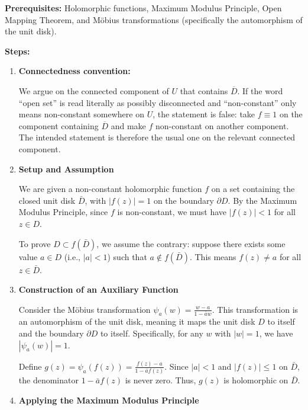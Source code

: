 \begin{solution}
\textbf{Prerequisites:} 
Holomorphic functions, Maximum Modulus Principle, Open Mapping Theorem, and Möbius transformations (specifically the automorphism of the unit disk).

\par\vspace{\baselineskip}
\textbf{Steps:}

\begin{enumerate}
    \item \textbf{Connectedness convention:}

    We argue on the connected component of $U$ that contains $\overline D$.  If the word ``open set'' is read literally as possibly disconnected and ``non-constant'' only means non-constant somewhere on $U$, the statement is false: take $f\equiv 1$ on the component containing $\overline D$ and make $f$ non-constant on another component.  The intended statement is therefore the usual one on the relevant connected component.

    \item \textbf{Setup and Assumption}

    We are given a non-constant holomorphic function $f$ on a set containing the closed unit disk $\bar{D}$, with $|f(z)| = 1$ on the boundary $\partial D$. By the Maximum Modulus Principle, since $f$ is non-constant, we must have $|f(z)| < 1$ for all $z \in D$.

    To prove $D \subset f(\bar{D})$, we assume the contrary: suppose there exists some value $a \in D$ (i.e., $|a| < 1$) such that $a \notin f(\bar{D})$. This means $f(z) \neq a$ for all $z \in \bar{D}$.

    \item \textbf{Construction of an Auxiliary Function}

    Consider the Möbius transformation $\psi_a(w) = \frac{w - a}{1 - \bar{a}w}$. This transformation is an automorphism of the unit disk, meaning it maps the unit disk $D$ to itself and the boundary $\partial D$ to itself. Specifically, for any $w$ with $|w|=1$, we have $|\psi_a(w)| = 1$.

    Define $g(z) = \psi_a(f(z)) = \frac{f(z) - a}{1 - \bar{a}f(z)}$. Since $|a| < 1$ and $|f(z)| \leq 1$ on $\bar{D}$, the denominator $1 - \bar{a}f(z)$ is never zero. Thus, $g(z)$ is holomorphic on $\bar{D}$. 

    \item \textbf{Applying the Maximum Modulus Principle}


\end{enumerate}
\end{solution}
